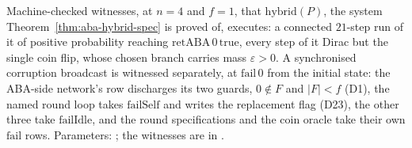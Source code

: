 \begin{definition}
  \label{def:aba-nonvacuity}
  \leanok
  Machine-checked witnesses, at $n = 4$ and $f = 1$, that $\mathrm{hybrid}(P)$, the system Theorem~\ref{thm:aba-hybrid-spec} is proved of, executes: a connected $21$-step run of it of positive probability reaching $\mathrm{retABA}\,0\,\mathrm{true}$, every step of it Dirac but the single coin flip, whose chosen branch carries mass $\varepsilon > 0$.
  A synchronised corruption broadcast is witnessed separately, at $\mathrm{fail}\,0$ from the initial state: the ABA-side network's row discharges its two guards, $0 \notin F$ and $|F| < f$ (D1), the named round loop takes $\mathrm{failSelf}$ and writes the replacement flag (D23), the other three take $\mathrm{failIdle}$, and the round specifications and the coin oracle take their own $\mathrm{fail}$ rows.
  Parameters: ; the witnesses are in .
\end{definition}
